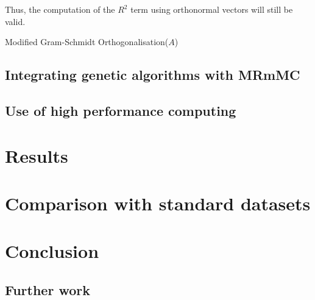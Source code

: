 \documentclass[12pt, twoside, a4paper]{report}
\begin{document}
Thus, the computation of the $R^2$ term using orthonormal vectors will still be valid.


\begin{algorithm}
\DontPrintSemicolon
{}
\BlankLine
{}
\caption{Modified Gram-Schmidt Orthogonalisation($A$) \label{MGS}}
\end{algorithm}



\section{Integrating genetic algorithms with MRmMC} \label{ga:mrmmc}

\section{Use of high performance computing}

\chapter{Results}

\chapter{Comparison with standard datasets}

\chapter{Conclusion}
\section{Further work}
\end{document}
